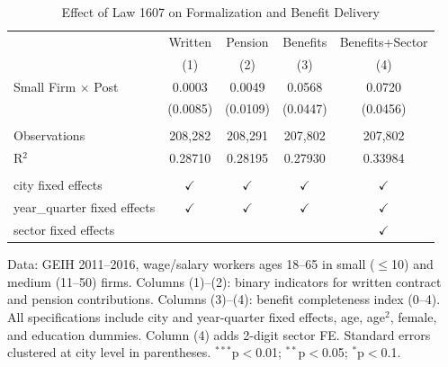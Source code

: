 
\begin{table}[htbp]
   \caption{\label{tab:main} Effect of Law 1607 on Formalization and Benefit Delivery}
   \bigskip
   \centering
   \begin{tabular}{lcccc}
      \toprule
                                   & Written       & Pension       & Benefits      & Benefits+Sector \\   
                                   & (1)           & (2)           & (3)           & (4)\\  
      \midrule 
      Small Firm $\times$ Post     & 0.0003        & 0.0049        & 0.0568        & 0.0720\\   
                                   & (0.0085)      & (0.0109)      & (0.0447)      & (0.0456)\\   
       \\
      Observations                 & 208,282       & 208,291       & 207,802       & 207,802\\  
      R$^2$                        & 0.28710       & 0.28195       & 0.27930       & 0.33984\\  
       \\
      city fixed effects           & $\checkmark$  & $\checkmark$  & $\checkmark$  & $\checkmark$\\   
      year\_quarter fixed effects  & $\checkmark$  & $\checkmark$  & $\checkmark$  & $\checkmark$\\   
      sector fixed effects         &               &               &               & $\checkmark$\\   
      \bottomrule
   \end{tabular}
   
   \par \raggedright 
   Data: GEIH 2011--2016, wage/salary workers ages 18--65 in small ($\leq$10) and medium (11--50) firms. Columns (1)--(2): binary indicators for written contract and pension contributions. Columns (3)--(4): benefit completeness index (0--4). All specifications include city and year-quarter fixed effects, age, age$^2$, female, and education dummies. Column (4) adds 2-digit sector FE. Standard errors clustered at city level in parentheses. $^{***}$p$<$0.01; $^{**}$p$<$0.05; $^{*}$p$<$0.1.
\end{table}


